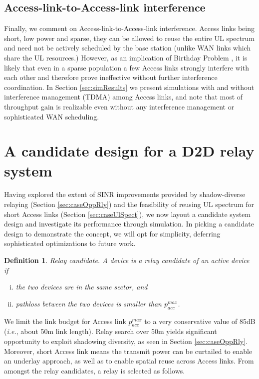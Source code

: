 \documentclass[journal]{IEEEtran}
\newtheorem{definit}{Definition}
\newcommand{\ie}{\emph{i.e.}}
\begin{document}
\subsection{Access-link-to-Access-link interference}
Finally, we comment on Access-link-to-Access-link interference.  Access links being short, low power and sparse, they can be allowed to reuse the entire UL spectrum and need not be actively scheduled by the base station (unlike WAN links which share the UL resources.)  However, as an implication of Birthday Problem \cite{Grimmett3rdEd}, it is likely that even in a sparse population a few Access links strongly interfere with each other and therefore prove ineffective without further interference coordination.  In Section \ref{sec:simResults} we present simulations with and without interference management (TDMA) among Access links, and note that most of throughput gain is realizable even without any interference management or sophisticated WAN scheduling.


\section{A candidate design for a D2D relay system}\label{sec:propDesign}
Having explored the extent of SINR improvements provided by shadow-diverse relaying (Section \ref{sec:caseOppRly}) and the feasibility of reusing UL spectrum for short Access links (Section \ref{sec:caseUlSpect}), we now layout a candidate system design and investigate its performance through simulation. In picking a candidate design to demonstrate the concept, we will opt for simplicity, deferring sophisticated optimizations to future work.

\begin{definit}
	{\em Relay candidate.} A device is a relay candidate of an active device if
	\begin{enumerate}[i.]
		\item the two devices are in the same sector, and
		\item pathloss between the two devices is smaller than $p^{max}_{acc}$.
	\end{enumerate}
\end{definit}

We limit the link budget for Access link $p^{max}_{acc}$ to a very conservative value of 85dB (\ie, about 50m link length).  Relay search over 50m yields significant opportunity to exploit shadowing diversity, as seen in Section \ref{sec:caseOppRly}.  Moreover, short Access link means the transmit power can be curtailed to enable an underlay approach, as well as to enable spatial reuse across Access links.  From amongst the relay candidates, a relay is selected as follows.
\end{document}
